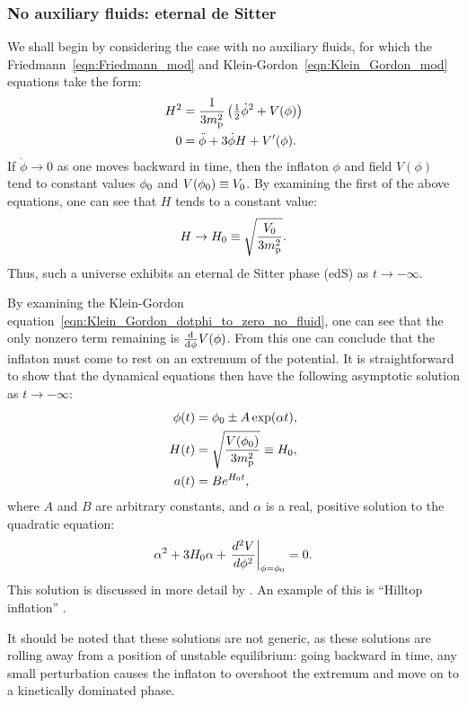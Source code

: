 \subsubsection{No auxiliary fluids: eternal de Sitter}
We shall begin by considering the case with no auxiliary fluids, for which the Friedmann~\eqref{eqn:Friedmann_mod} and Klein-Gordon~\eqref{eqn:Klein_Gordon_mod} equations take the form:
%
\begin{align}
  H^2 
  &=
  \frac{1}{3m_{\mathrm{p}}^2}\left({\textstyle\frac{1}{2}}\dot{\phi}^2 + V(\phi) \right)
  \label{eqn:Friedmann_dotphi_to_zero_no_fluid} 
  \\
  0
  &=
  \ddot{\phi} +3\dot{\phi}H + V^\prime(\phi).
  \label{eqn:Klein_Gordon_dotphi_to_zero_no_fluid}
\end{align}
%
If $\dot{\phi}\to 0$ as one moves backward in time, then the inflaton $\phi$ and field $V(\phi)$ tend to constant values $\phi_0$ and $V(\phi_0)\equiv V_0$. By examining the first of the above equations, one can see that $H$ tends to a constant value:
%
\begin{equation}
  H\to H_0 \equiv \sqrt{\frac{V_0}{3m_{\mathrm{p}}^2}}.
\end{equation}
%
Thus, such a universe exhibits an eternal de Sitter phase (edS) as $t\to-\infty$.

By examining the Klein-Gordon equation~\eqref{eqn:Klein_Gordon_dotphi_to_zero_no_fluid}, one can see that the only nonzero term remaining is $\frac{\operatorname{d}^{}\!{}}{\operatorname{d}^{}\!{\phi}}V(\phi)$. From this one can conclude that the inflaton must come to rest on an extremum of the potential. It is straightforward to show that the dynamical equations then have the following asymptotic solution as $t \to -\infty$:
%
\begin{align}
  \phi(t)
  &=
  \phi_0 \pm A \exp(\alpha t),\\
  H(t)
  &=
  \sqrt{\frac{V(\phi_0)}{3m_{\mathrm{p}}^2}} \equiv H_0,\\
  a(t)
  &=
  B e^{H_0t},
\end{align}
%
where $A$ and $B$  are arbitrary constants, and $\alpha$ is a real, positive solution to the quadratic equation:
% 
%
\begin{equation}
  \alpha^2 + 3H_0\alpha + \left.
  \frac{{d^2}V}{{d}\phi^2}\right|_{\phi=\phi_0}=0.
\end{equation}
%
This solution is discussed in more detail by \citet{destri_preinflationary_2010}. An example of this is ``Hilltop inflation'' \citep{linde_1982,albrecht_1982}. 

It should be noted that these solutions are not generic, as these solutions are rolling away from a position of unstable equilibrium: going backward in time, any small perturbation causes the inflaton to overshoot the extremum and move on to a kinetically dominated phase.

